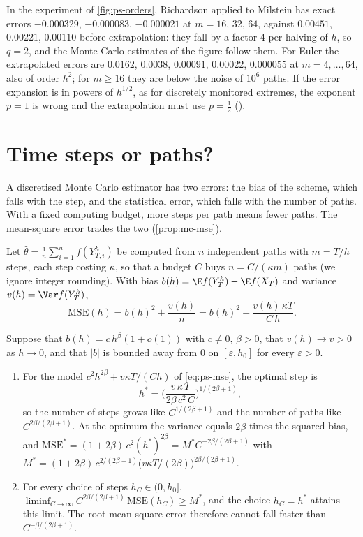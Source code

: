 In the experiment of \cref{fig:ps-orders}, Richardson applied to Milstein has exact errors
$-0.000329$, $-0.000083$, $-0.000021$ at $m=16$, $32$, $64$, against $0.00451$, $0.00221$,
$0.00110$ before extrapolation: they fall by a factor $4$ per halving of $h$, so $q=2$, and
the Monte Carlo estimates of the figure follow them. For Euler the extrapolated errors are
$0.0162$, $0.0038$, $0.00091$, $0.00022$, $0.000055$ at $m=4,\dots,64$, also of order $h^2$;
for $m\ge16$ they are below the noise of $10^6$ paths. If the error expansion is
in powers of $h^{1/2}$, as for discretely monitored extremes, the exponent $p=1$ is wrong and
the extrapolation must use $p=\frac12$ ().

\section{Time steps or paths?}\label{sec:ps-allocation}

A discretised Monte Carlo estimator has two errors: the bias of the scheme, which falls with
the step, and the statistical error, which falls with the number of paths. With a fixed
computing budget, more steps per path means fewer paths. The mean-square error trades the two
(\cref{prop:mc-mse}).

Let $\hat\theta=\frac1n\sum_{i=1}^nf(Y^h_{T,i})$ be computed from $n$ independent paths with
$m=T/h$ steps, each step costing $\kappa$, so that a budget $C$ buys $n=C/(\kappa m)$ paths
(we ignore integer rounding). With bias $b(h)=\E f(Y^h_T)-\E f(X_T)$ and variance
$v(h)=\Var f(Y^h_T)$,
\begin{equation}\label{eq:ps-mse}
  \mathrm{MSE}(h)=b(h)^2+\frac{v(h)}n=b(h)^2+\frac{v(h)\,\kappa T}{C\,h} .
\end{equation}

\begin{proposition}\label{prop:ps-allocation}
Suppose that $b(h)=c\,h^\beta(1+o(1))$ with $c\ne0$, $\beta>0$, that $v(h)\to v>0$ as $h\to0$,
and that $|b|$ is bounded away from $0$ on $[\varepsilon,h_0]$ for every $\varepsilon>0$.
\begin{enumerate}[label=(\roman*)]
  \item For the model $c^2h^{2\beta}+v\kappa T/(Ch)$ of \eqref{eq:ps-mse}, the optimal step
    is
    \[
      h^*=\Big(\frac{v\,\kappa\,T}{2\beta\,c^2\,C}\Big)^{1/(2\beta+1)},
    \]
    so the number of steps grows like $C^{1/(2\beta+1)}$ and the number of paths like
    $C^{2\beta/(2\beta+1)}$. At the optimum the variance equals $2\beta$ times the squared
    bias, and $\mathrm{MSE}^*=(1+2\beta)\,c^2(h^*)^{2\beta}=M^*C^{-2\beta/(2\beta+1)}$ with
    $M^*=(1+2\beta)\,c^{2/(2\beta+1)}\big(v\kappa T/(2\beta)\big)^{2\beta/(2\beta+1)}$.
  \item For every choice of steps $h_C\in(0,h_0]$,
    $\liminf_{C\to\infty}C^{2\beta/(2\beta+1)}\,\mathrm{MSE}(h_C)\ge M^*$, and the choice
    $h_C=h^*$ attains this limit. The root-mean-square error therefore cannot fall faster
    than $C^{-\beta/(2\beta+1)}$.
\end{enumerate}
\end{proposition}

